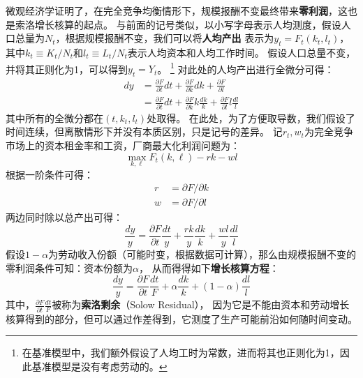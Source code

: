 微观经济学证明了，在完全竞争均衡情形下，规模报酬不变最终带来\textbf{零利润}，这也是索洛增长核算的起点。
与前面的记号类似，以小写字母表示人均测度，假设人口总量为$N_t$，根据规模报酬不变，我们可以将\textbf{人均产出}
表示为$y_t=F_t\left(k_t,l_t\right)$，其中$k_t\equiv K_t/N_t$和$l_t\equiv L_t/N_t$表示人均资本和人均工作时间。
假设人口总量不变，并将其正则化为1，可以得到$y_t=Y_t$。
\footnote{在基准模型中，我们额外假设了人均工时为常数，进而将其也正则化为1，因此基准模型是没有考虑劳动的。}
对此处的人均产出进行全微分可得：
\begin{equation}
    \begin{aligned}
        dy &= \frac{\partial F}{\partial t}dt + \frac{\partial F}{\partial k}dk + \frac{\partial F}{\partial l} \\
            &=  \frac{\partial F}{\partial t}dt 
                + \frac{\partial F}{\partial k} k \frac{dk}{k} + \frac{\partial F}{\partial l} l \frac{dl}{l}
    \end{aligned}
\end{equation}
其中所有的全微分都在$\left(t,k_t,l_t\right)$处取得。
在此处，为了方便取导数，我们假设了时间连续，但离散情形下并没有本质区别，只是记号的差异。
记$r_t, w_t$为完全竞争市场上的资本租金率和工资，厂商最大化利润问题为：
\begin{equation*}
    \max _{k, \ell} F_t(k, \ell)-r k-w l
\end{equation*}
根据一阶条件可得：
\begin{align}
    r &= \partial F / \partial k \\
    w &= \partial F / \partial l
\end{align}
两边同时除以总产出可得：
\begin{equation}
    \frac{d y}{y} = \frac{\partial F}{\partial t} 
        \frac{d t}{y} + \frac{r k}{y} \frac{d k}{k} + \frac{w l}{y} \frac{d l}{l}
\end{equation}
假设$1-\alpha$为劳动收入份额（可能时变，根据数据可计算），那么由规模报酬不变的零利润条件可知：资本份额为$\alpha$，
从而得得如下\textbf{增长核算方程}：
\begin{equation}
    \frac{d y}{y}=\frac{\partial F}{\partial t} \frac{d t}{F}+\alpha \frac{d k}{k}+(1-\alpha) \frac{d l}{l}
\end{equation}
其中，$\frac{\partial F}{\partial t}\frac{dt}{F}$被称为\textbf{索洛剩余}（Solow Residual），
因为它是不能由资本和劳动增长核算得到的部分，但可以通过作差得到，它测度了生产可能前沿如何随时间变动。

